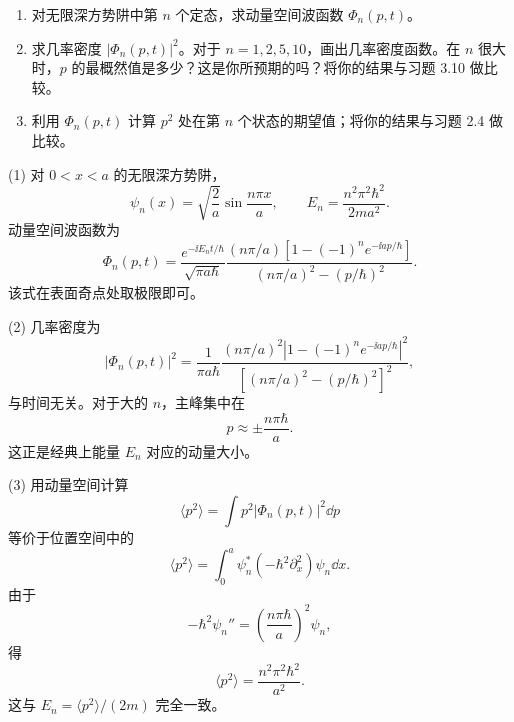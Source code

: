 \begin{question}
\begin{enumerate}
\item 对无限深方势阱中第 $n$ 个定态，求动量空间波函数 $\Phi_n(p,t)$。
\item 求几率密度 $|\Phi_n(p,t)|^2$。对于 $n=1,2,5,10$，画出几率密度函数。在 $n$ 很大时，$p$ 的最概然值是多少？这是你所预期的吗？将你的结果与习题 3.10 做比较。
\item 利用 $\Phi_n(p,t)$ 计算 $p^2$ 处在第 $n$ 个状态的期望值；将你的结果与习题 2.4 做比较。
\end{enumerate}
\end{question}
\begin{solution}
(1) 对 $0<x<a$ 的无限深方势阱，
\[
\psi_n(x)=\sqrt{\frac2a}\sin\frac{n\pi x}{a},
\qquad E_n=\frac{n^2\pi^2\hbar^2}{2ma^2}.
\]
动量空间波函数为
\[
\Phi_n(p,t)=\frac{e^{-\ii E_nt/\hbar}}{\sqrt{\pi a\hbar}}
\frac{(n\pi/a)\left[1-(-1)^ne^{-\ii ap/\hbar}\right]}
{(n\pi/a)^2-(p/\hbar)^2}.
\]
该式在表面奇点处取极限即可。

(2) 几率密度为
\[
|\Phi_n(p,t)|^2=\frac1{\pi a\hbar}
\frac{(n\pi/a)^2\left|1-(-1)^ne^{-\ii ap/\hbar}\right|^2}
{\left[(n\pi/a)^2-(p/\hbar)^2\right]^2},
\]
与时间无关。对于大的 $n$，主峰集中在
\[
\boxed{p\approx \pm\frac{n\pi\hbar}{a}.}
\]
这正是经典上能量 $E_n$ 对应的动量大小。

(3) 用动量空间计算
\[
\langle p^2\rangle=\int p^2|\Phi_n(p,t)|^2\dd p
\]
等价于位置空间中的
\[
\langle p^2\rangle=\int_0^a\psi_n^*(-\hbar^2\partial_x^2)\psi_n\dd x.
\]
由于
\[
-\hbar^2\psi_n''=\left(\frac{n\pi\hbar}{a}\right)^2\psi_n,
\]
得
\[
\boxed{\langle p^2\rangle=\frac{n^2\pi^2\hbar^2}{a^2}.}
\]
这与 $E_n=\langle p^2\rangle/(2m)$ 完全一致。
\end{solution}

